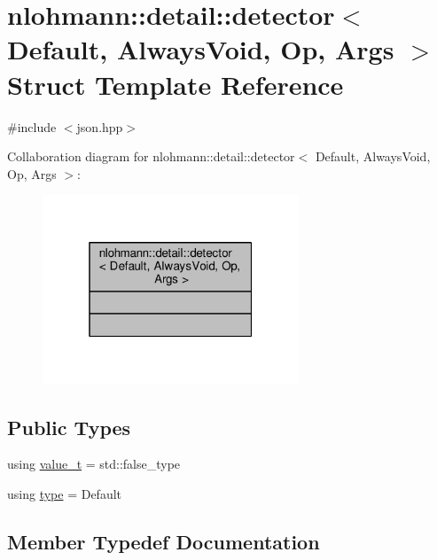 \hypertarget{structnlohmann_1_1detail_1_1detector}{}\section{nlohmann\+:\+:detail\+:\+:detector$<$ Default, Always\+Void, Op, Args $>$ Struct Template Reference}
\label{structnlohmann_1_1detail_1_1detector}


{\ttfamily \#include $<$json.\+hpp$>$}



Collaboration diagram for nlohmann\+:\+:detail\+:\+:detector$<$ Default, Always\+Void, Op, Args $>$\+:
\nopagebreak
\begin{figure}[H]
\begin{center}
\leavevmode
\includegraphics[width=217pt]{structnlohmann_1_1detail_1_1detector__coll__graph}
\end{center}
\end{figure}
\subsection*{Public Types}
\begin{DoxyCompactItemize}
\item 
using \hyperlink{structnlohmann_1_1detail_1_1detector_a5a132aab543d1706e2439268faf8d487}{value\+\_\+t} = std\+::false\+\_\+type
\item 
using \hyperlink{structnlohmann_1_1detail_1_1detector_a0cd69423587748bf3d3d702cc7b7c2ce}{type} = Default
\end{DoxyCompactItemize}


\subsection{Member Typedef Documentation}
